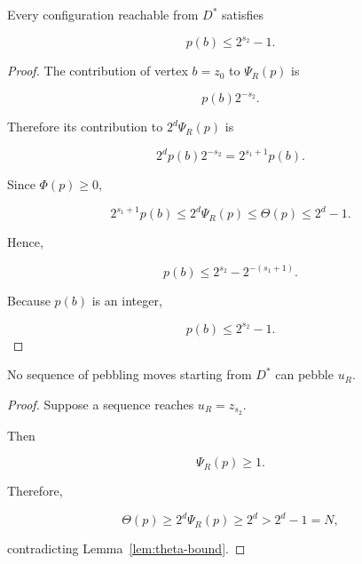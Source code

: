 \begin{lemma}
\label{lem:b-capacity}

Every configuration reachable from $D^*$ satisfies

\[
p(b)\le2^{s_2}-1 .
\]

\end{lemma}



\begin{proof}

The contribution of vertex $b=z_0$ to $\Psi_R(p)$ is

\[
p(b)2^{-s_2}.
\]

Therefore its contribution to $2^d\Psi_R(p)$ is

\[
2^d p(b)2^{-s_2}
=
2^{s_1+1}p(b).
\]

Since $\Phi(p)\ge0$,

\[
2^{s_1+1}p(b)
\le
2^d\Psi_R(p)
\le
\Theta(p)
\le
2^d-1 .
\]

Hence,

\[
p(b)
\le
2^{s_2}-2^{-(s_1+1)} .
\]

Because $p(b)$ is an integer,

\[
p(b)\le2^{s_2}-1 .
\]

\end{proof}



\begin{corollary}
\label{cor:bypass}

No sequence of pebbling moves starting from $D^*$ can pebble $u_R$.

\end{corollary}



\begin{proof}

Suppose a sequence reaches $u_R=z_{s_2}$.

Then

\[
\Psi_R(p)\ge1 .
\]

Therefore,

\[
\Theta(p)
\ge
2^d\Psi_R(p)
\ge
2^d
>
2^d-1=N ,
\]

contradicting Lemma~\ref{lem:theta-bound}.

\end{proof}